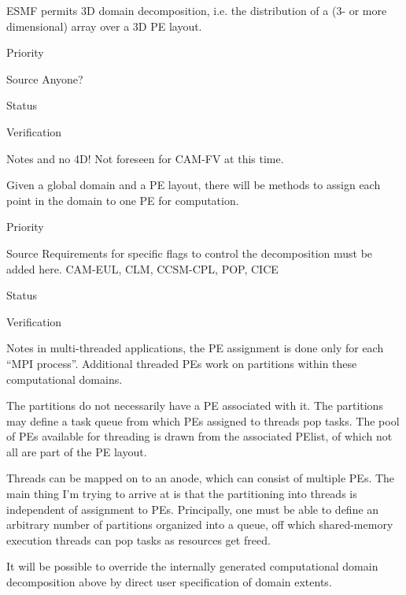 
ESMF permits 3D domain decomposition, i.e. the distribution of a
(3- or more dimensional) array over a 3D PE layout.

\begin{reqlist}
\item[Priority]
\item[Source] Anyone?
\item[Status]
\item[Verification]
\item[Notes] and no 4D!    Not foreseen for CAM-FV at this time.
\end{reqlist}


Given a global domain and a PE layout, there will be methods to assign
each point in the domain to one PE for computation. 

\begin{reqlist}
\item[Priority] 
\item[Source] Requirements for specific flags to control the
  decomposition must be added here. CAM-EUL, CLM, CCSM-CPL, POP, CICE 
\item[Status]
\item[Verification]
\item[Notes] in multi-threaded applications, the PE assignment is done
  only for each ``MPI process''. Additional threaded PEs work on
  partitions within these computational domains.
  
  The partitions do not necessarily have a PE associated with it. The
  partitions may define a task queue from which PEs assigned to
  threads pop tasks. The pool of PEs available for threading is drawn
  from the associated PElist, of which not all are part of the PE
  layout.
  
  Threads can be mapped on to an anode, which can consist of multiple
  PEs.  The main thing I'm trying to arrive at is that the
  partitioning into threads is independent of assignment to PEs.
  Principally, one must be able to define an arbitrary number of
  partitions organized into a queue, off which shared-memory execution
  threads can pop tasks as resources get freed.
\end{reqlist}


It will be possible to override the internally generated computational
domain decomposition above by direct user specification of domain
extents.

